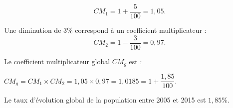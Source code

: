 \begin{corrige}
\begin{itemize}
          \[ CM_1=1+\dfrac{5}{100} = 1,05.\]
          \par
          Une diminution de $3\%$ correspond à un coefficient multiplicateur :
          \[ CM_2=1-\dfrac{3}{100} =0,97. \]
          \par
          Le coefficient multiplicateur global $CM_g$ est :
          \par
          $ CM_g=CM_1\times CM_2 = 1,05\times 0,97 = 1,0185 = 1+\dfrac{1,85}{100}. $
          \par
          Le taux d'évolution global de la population entre 2005 et 2015 est $1,85\%$.
          \par
          \par
     \end{itemize}
     \par
\end{corrige}
